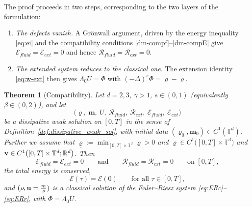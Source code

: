 \documentclass[12pt,a4paper,twoside]{article}
\newcommand{\vr}{\varrho}
\newcommand{\vu}{\vc{u}}
\newcommand{\vv}{\vc{v}}
\newcommand{\vc}[1]{{\bf #1}}
\newcommand{\R}{\mathbb{R}}
\newtheorem{thm}{Theorem}
\numberwithin{equation}{section}%
\newcommand{\T}{\mathbb{T}}
\begin{document}
The proof proceeds in two steps, corresponding to the two layers of the formulation:
\begin{enumerate}[leftmargin=*]
	\item[(1)] \emph{The defects vanish.} A Gr\"onwall argument, driven by the energy inequality \eqref{eq:ei} and the compatibility conditions \eqref{dm-compf}--\eqref{dm-compE} give $\mathcal E_{fluid}=\mathcal E_{ext}=0$ and hence $\mathcal R_{fluid}=\mathcal R_{ext}=0$.
	\item[(2)] \emph{The extended system reduces to the classical one.} The extension identity \eqref{eq:w-ext} then gives $\Lambda_0 U=\Phi$ with $(-\Delta)^s\Phi=\vr-\bar\vr$.
\end{enumerate}

\begin{thm}[Compatibility]\label{thm:compatibility}
	Let $d=2,3$, $\gamma>1$, $s\in(0,1)$ (equivalently $\beta\in (0,2)$), and let
	\[
	\big(\vr,\ \mathbf m,\ U,\ \mathcal R_{fluid},\ \mathcal R_{ext},\ \mathcal E_{fluid},\ \mathcal E_{ext}\big)
	\]
	be a dissipative weak solution on $[0,T]$ in the sense of Definition~\ref{def:dissipative_weak_sol}, with initial data $(\vr_0,\mathbf m_0) \in C^1(\T^d)$. Further we assume that $
	\underline \vr:=\min_{[0,T]\times\mathbb T^d} \vr>0 $ and $\vr \in C^1\big([0,T]\times\mathbb T^d\big)$ and $ \vv \in C^1\big([0,T]\times\mathbb T^d;\R^d\big)$.
	Then
	\begin{equation}\label{defect0}
		\mathcal E_{fluid} = \mathcal E_{ext} = 0
		\qquad\text{and}\qquad
		\mathcal R_{fluid} = \mathcal R_{ext} = 0
		\qquad\text{on } [0,T],
	\end{equation}
	the total energy is conserved,
	\begin{equation}\label{comp-eid}
		\mathcal E(\tau) = \mathcal E(0) \qquad\text{for all } \tau\in[0,T],
	\end{equation}
	and $(\vr,\vu=\frac{m}{\vr})$ is a classical solution of the Euler--Riesz system \eqref{eq:ERc}--\eqref{eq:ERr}, with $\Phi = \Lambda_0 U$.
\end{thm}
\end{document}
